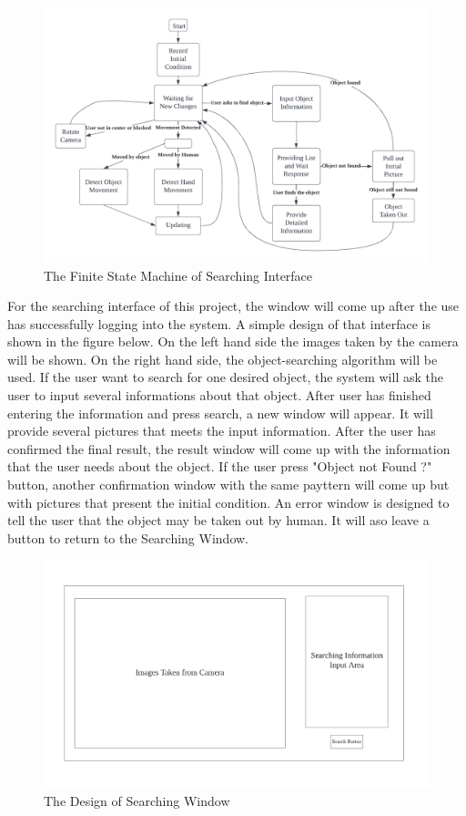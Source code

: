 \documentclass[12pt, titlepage]{article}
\begin{document}
\begin{figure}[H]
    \centering
    \includegraphics[scale=0.8]{FSM.png}
    \caption{The Finite State Machine of Searching Interface}
\end{figure}

For the searching interface of this project, the window will come up after the use has successfully logging into the system. A simple design of that interface is shown in the figure below. On the left hand side the images taken by the camera will be shown. On the right hand side, the object-searching algorithm will be used. If the user want to search for one desired object, the system will ask the user to input several informations about that object. After user has finished entering the information and press search, a new window will appear. It will provide several pictures that meets the input information. After the user has confirmed the final result, the result window will come up with the information that the user needs about the object.
If the user press "Object not Found ?" button, another confirmation window with the same payttern will come up but with pictures that present the initial condition. An error window is designed to tell the user that the object may be taken out by human. It will aso leave a button to return to the Searching Window. 

\begin{figure}[H]
    \centering
    \includegraphics[scale=0.6]{Search.png}
    \caption{The Design of Searching Window}
\end{figure}
\end{document}
